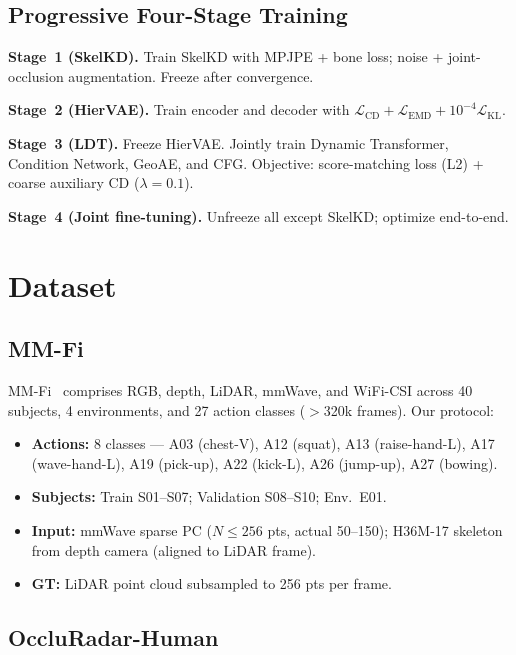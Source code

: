 \documentclass{article}
\begin{document}
\subsection{Progressive Four-Stage Training}
\label{sec:training}

\textbf{Stage~1 (SkelKD).}
Train SkelKD with MPJPE + bone loss; noise + joint-occlusion augmentation.
Freeze after convergence.

\textbf{Stage~2 (HierVAE).}
Train encoder and decoder with $\mathcal{L}_\text{CD}+\mathcal{L}_\text{EMD}
+10^{-4}\mathcal{L}_\text{KL}$.

\textbf{Stage~3 (LDT).}
Freeze HierVAE.
Jointly train Dynamic Transformer, Condition Network, GeoAE, and CFG.
Objective: score-matching loss (L2) + coarse auxiliary CD ($\lambda\!=\!0.1$).

\textbf{Stage~4 (Joint fine-tuning).}
Unfreeze all except SkelKD; optimize end-to-end.

\section{Dataset}
\label{sec:dataset}

\subsection{MM-Fi}
\label{sec:mmfi}

MM-Fi~\cite{yang2023mmfi} comprises RGB, depth, LiDAR, mmWave, and WiFi-CSI
across 40 subjects, 4 environments, and 27 action classes ($>$320k frames).
Our protocol:
\begin{itemize}[leftmargin=1.5em,itemsep=1pt]
  \item \textbf{Actions:} 8 classes --- A03 (chest-V), A12 (squat), A13
        (raise-hand-L), A17 (wave-hand-L), A19 (pick-up), A22 (kick-L),
        A26 (jump-up), A27 (bowing).
  \item \textbf{Subjects:} Train S01--S07; Validation S08--S10; Env.\ E01.
  \item \textbf{Input:} mmWave sparse PC ($N\!\leq\!256$ pts, actual 50--150);
        H36M-17 skeleton from depth camera (aligned to LiDAR frame).
  \item \textbf{GT:} LiDAR point cloud subsampled to 256 pts per frame.
\end{itemize}

\subsection{OccluRadar-Human}
\label{sec:occludata}
\end{document}
